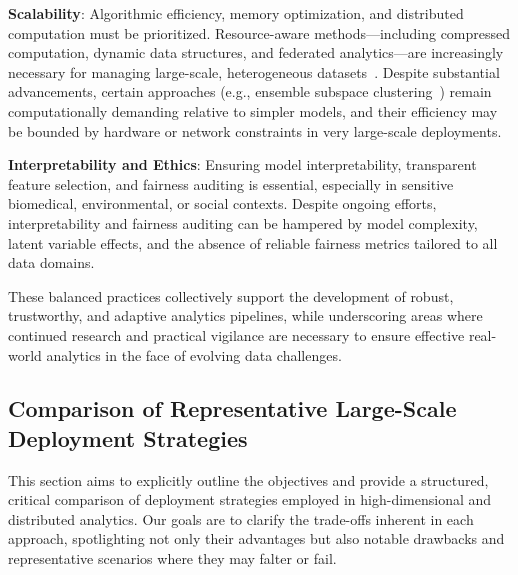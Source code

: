 \documentclass[sigconf]{acmart}
\begin{document}
\textbf{Scalability}: Algorithmic efficiency, memory optimization, and distributed computation must be prioritized. Resource-aware methods—including compressed computation, dynamic data structures, and federated analytics—are increasingly necessary for managing large-scale, heterogeneous datasets~\cite{ref118}. Despite substantial advancements, certain approaches (e.g., ensemble subspace clustering~\cite{ref116}) remain computationally demanding relative to simpler models, and their efficiency may be bounded by hardware or network constraints in very large-scale deployments.

\textbf{Interpretability and Ethics}: Ensuring model interpretability, transparent feature selection, and fairness auditing is essential, especially in sensitive biomedical, environmental, or social contexts. Despite ongoing efforts, interpretability and fairness auditing can be hampered by model complexity, latent variable effects, and the absence of reliable fairness metrics tailored to all data domains.

These balanced practices collectively support the development of robust, trustworthy, and adaptive analytics pipelines, while underscoring areas where continued research and practical vigilance are necessary to ensure effective real-world analytics in the face of evolving data challenges.

\subsection{Comparison of Representative Large-Scale Deployment Strategies}

This section aims to explicitly outline the objectives and provide a structured, critical comparison of deployment strategies employed in high-dimensional and distributed analytics. Our goals are to clarify the trade-offs inherent in each approach, spotlighting not only their advantages but also notable drawbacks and representative scenarios where they may falter or fail.
\end{document}
